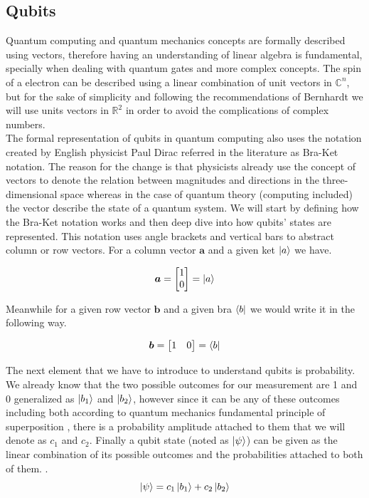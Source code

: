 \documentclass[12pt,a4paper]{scrartcl}
\begin{document}
\subsection{Qubits}
Quantum computing and quantum mechanics concepts are formally described using vectors, therefore having an understanding of linear algebra is fundamental, specially when dealing with quantum gates and more complex concepts. The spin of a electron can be described using a linear combination of unit vectors in ${\mathbb{C}^n}$, but for the sake of simplicity and following the recommendations of Bernhardt \cite{bernhardt2019quantum} we will use units vectors in ${\mathbb{R}^2}$ in order to avoid the complications of complex numbers. \\

The formal representation of qubits in quantum computing also uses the notation created by English physicist Paul Dirac referred in the literature as Bra-Ket notation. The reason for the change is that physicists already use the concept of vectors to denote the relation between magnitudes and directions in the three-dimensional space whereas in the case of quantum theory (computing included) the vector describe the state of a quantum system.
We will start by defining how the Bra-Ket notation works and then deep dive into how qubits' states are represented. This notation uses angle brackets and vertical bars to abstract column or row vectors. For a column vector $\boldsymbol{a}$ and a given ket $\ket{a}$ we have.

\[\boldsymbol{a} = \begin{bmatrix}1 \\ 0 \end{bmatrix} = \ket{a} \]

Meanwhile for a given row vector $\boldsymbol{b}$ and a given bra ${\bra{b}}$ we would write it in the following way.

\[\boldsymbol{b} = \begin{bmatrix}1 & 0 \end{bmatrix} = \bra{b}\]

The next element that we have to introduce to understand qubits is probability. We already know that the two possible outcomes for our measurement are 1 and 0 generalized as $\ket{b_1}$ and $\ket{b_2}$, however since it can be any of these outcomes including both according to quantum mechanics fundamental principle of superposition \cite{dirac1947}, there is a probability amplitude attached to them that we will denote as $c_1$ and $c_2$. Finally a qubit state (noted as $\ket{\psi}$) can be given as the linear combination of its possible outcomes and the probabilities attached to both of them. \cite{bernhardt2019quantum}.
\begin{equation}\label{eq:1}
    \ket{\psi} = c_1\ket{b_1} + c_2\ket{b_2}
\end{equation}
\end{document}
